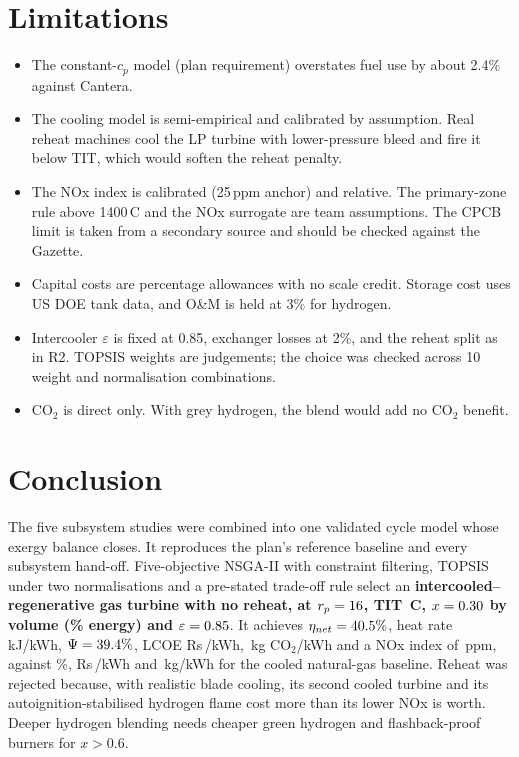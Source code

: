 \documentclass[10pt,a4paper,twocolumn]{article}
\newcommand{\Rs}{Rs\,}
\begin{document}
\section{Limitations}
\begin{itemize}
\item The constant-$c_p$ model (plan requirement) overstates fuel use by about 2.4\% against Cantera.
\item The cooling model is semi-empirical and calibrated by assumption. Real reheat machines cool the LP turbine with lower-pressure bleed and fire it below TIT, which would soften the reheat penalty.
\item The NOx index is calibrated (25\,ppm anchor) and relative. The primary-zone rule above 1400\,\textdegree C and the NOx surrogate are team assumptions. The CPCB limit is taken from a secondary source and should be checked against the Gazette.
\item Capital costs are percentage allowances with no scale credit. Storage cost uses US DOE tank data, and O\&M is held at 3\% for hydrogen.
\item Intercooler $\varepsilon$ is fixed at 0.85, exchanger losses at 2\%, and the reheat split as in R2. TOPSIS weights are judgements; the choice was checked across 10 weight and normalisation combinations.
\item CO$_2$ is direct only. With grey hydrogen, the blend would add no CO$_2$ benefit.
\end{itemize}

\section{Conclusion}
The five subsystem studies were combined into one validated cycle model whose exergy balance closes. It reproduces the plan's reference baseline and every subsystem hand-off. Five-objective NSGA-II with constraint filtering, TOPSIS under two normalisations and a pre-stated trade-off rule select an \textbf{intercooled--regenerative gas turbine with no reheat, at $r_p=16$, TIT \finTITC\,\textdegree C, $x=0.30$ by volume (\finE\% energy) and $\varepsilon=0.85$}. It achieves $\eta_{net}=40.5\%$, heat rate \finHR\,kJ/kWh, $\Psi=39.4\%$, LCOE \Rs\finLCOE/kWh, \finCO\,kg CO$_2$/kWh and a NOx index of \finNOx\,ppm, against \bcEta\%, \Rs\bcLCOE/kWh and \bcCO\,kg/kWh for the cooled natural-gas baseline. Reheat was rejected because, with realistic blade cooling, its second cooled turbine and its autoignition-stabilised hydrogen flame cost more than its lower NOx is worth. Deeper hydrogen blending needs cheaper green hydrogen and flashback-proof burners for $x>0.6$.
\end{document}
